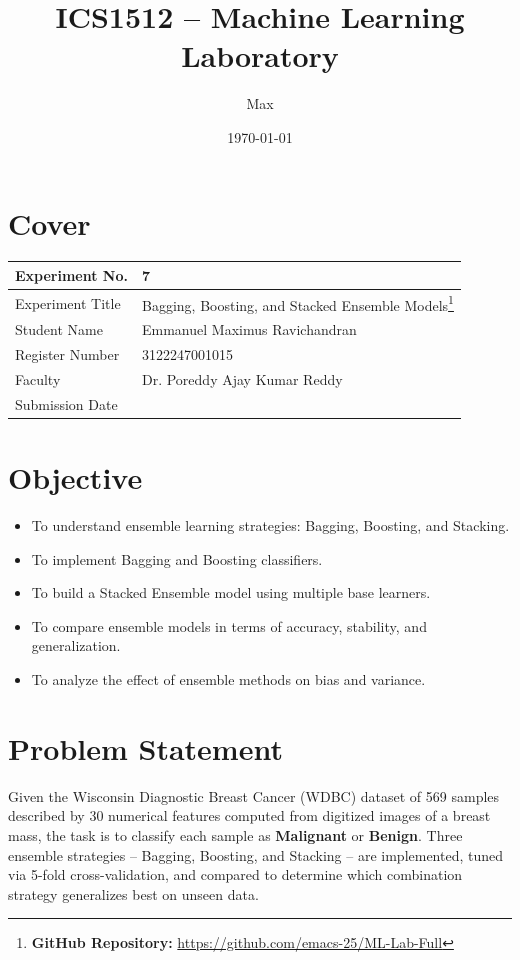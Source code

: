\documentclass[12pt,a4paper]{article}
\author{Max}
\date{\today}
\title{ICS1512 -- Machine Learning Laboratory}
\begin{document}
\maketitle

\section{Cover}
\label{sec:orgd96b516}
\begin{center}
\begin{tabular}{|p{4cm}|p{11cm}|}
\hline
Experiment No. & 7\\[0pt]
\hline
Experiment Title & Bagging, Boosting, and Stacked Ensemble Models\footnote{\textbf{GitHub Repository: }\url{https://github.com/emacs-25/ML-Lab-Full}}\\[0pt]
\hline
Student Name & Emmanuel Maximus Ravichandran\\[0pt]
\hline
Register Number & 3122247001015\\[0pt]
\hline
Faculty & Dr. Poreddy Ajay Kumar Reddy\\[0pt]
\hline
Submission Date & \\[0pt]
\hline
\end{tabular}
\end{center}

\section{Objective}
\label{sec:org07e3a59}
\begin{itemize}
\item To understand ensemble learning strategies: Bagging, Boosting, and Stacking.
\item To implement Bagging and Boosting classifiers.
\item To build a Stacked Ensemble model using multiple base learners.
\item To compare ensemble models in terms of accuracy, stability, and generalization.
\item To analyze the effect of ensemble methods on bias and variance.
\end{itemize}

\section{Problem Statement}
\label{sec:orgee43b85}
Given the Wisconsin Diagnostic Breast Cancer (WDBC) dataset of 569 samples described by 30
numerical features computed from digitized images of a breast mass, the task is to classify each
sample as \textbf{Malignant} or \textbf{Benign}. Three ensemble strategies -- Bagging, Boosting, and Stacking --
are implemented, tuned via 5-fold cross-validation, and compared to determine which combination
strategy generalizes best on unseen data.
\end{document}
